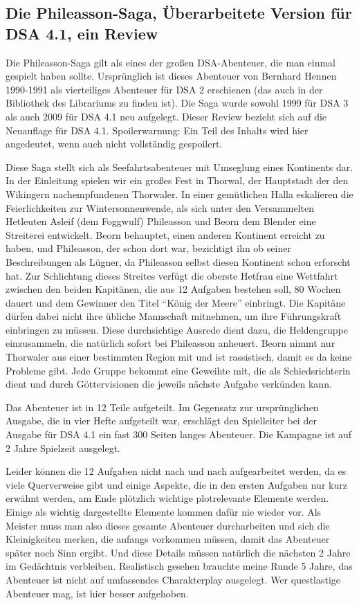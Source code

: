 \documentclass[final]{multiversum}
\begin{document}
\makemultititle
%

\subsection{Die Phileasson-Saga, Überarbeitete Version für DSA 4.1, ein Review}
Die Phileasson-Saga gilt als eines der großen DSA-Abenteuer, die man einmal
gespielt haben sollte. Ursprünglich ist dieses Abenteuer von Bernhard Hennen
1990-1991 als vierteiliges Abenteuer für DSA 2 erschienen (das auch in der
Bibliothek des Librariums zu finden ist). Die Saga wurde sowohl 1999 für DSA 3
als auch 2009 für DSA 4.1 neu aufgelegt. Dieser Review bezieht sich auf die
Neuauflage für DSA 4.1. Spoilerwarnung: Ein Teil des Inhalts wird hier
angedeutet, wenn auch nicht vollständig gespoilert.

Diese Saga stellt sich als Seefahrtsabenteuer mit Umseglung eines Kontinents
dar. In der Einleitung spielen wir ein großes Fest in Thorwal, der Hauptstadt
der den Wikingern nachempfundenen Thorwaler. In einer gemütlichen Halla
eskalieren die Feierlichkeiten zur Wintersonnenwende, als sich unter den
Versammelten Hetleuten Asleif (dem Foggwulf) Phileasson und Beorn dem Blender
eine Streiterei entwickelt. Beorn behauptet, einen anderen Kontinent erreicht zu
haben, und Phileasson, der schon dort war, bezichtigt ihn ob seiner
Beschreibungen als Lügner, da Phileasson selbst diesen Kontinent schon erforscht
hat. Zur Schlichtung dieses Streites verfügt die oberste Hetfrau eine Wettfahrt
zwischen den beiden Kapitänen, die aus 12 Aufgaben bestehen soll, 80 Wochen
dauert und dem Gewinner den Titel “König der Meere” einbringt. Die Kapitäne
dürfen dabei nicht ihre übliche Mannschaft mitnehmen, um ihre Führungskraft
einbringen zu müssen. Diese durchsichtige Ausrede dient dazu, die Heldengruppe
einzusammeln, die natürlich sofort bei Phileasson anheuert. Beorn nimmt nur
Thorwaler aus einer bestimmten Region mit und ist rassistisch, damit es da keine
Probleme gibt. Jede Gruppe bekommt eine Geweihte mit, die als Schiedsrichterin
dient und durch Göttervisionen die jeweils nächste Aufgabe verkünden kann.

Das Abenteuer ist in 12 Teile aufgeteilt. Im Gegensatz zur ursprünglichen
Ausgabe, die in vier Hefte aufgeteilt war, erschlägt den Spielleiter bei der
Ausgabe für DSA 4.1 ein fast 300 Seiten langes Abenteuer. Die Kampagne ist auf 2
Jahre Spielzeit ausgelegt.

Leider können die 12 Aufgaben nicht nach und nach aufgearbeitet werden, da es
viele Querverweise gibt und einige Aspekte, die in den ersten Aufgaben nur kurz
erwähnt werden, am Ende plötzlich wichtige plotrelevante Elemente werden. Einige
als wichtig dargestellte Elemente kommen dafür nie wieder vor. Als Meister muss
man also dieses gesamte Abenteuer durcharbeiten und sich die Kleinigkeiten
merken, die anfangs vorkommen müssen, damit das Abenteuer später noch Sinn
ergibt. Und diese Details müssen natürlich die nächsten 2 Jahre im Gedächtnis
verbleiben. Realistisch gesehen brauchte meine Runde 5 Jahre, das Abenteuer ist
nicht auf umfassendes Charakterplay ausgelegt. Wer questlastige Abenteuer mag,
ist hier besser aufgehoben.
\end{document}

